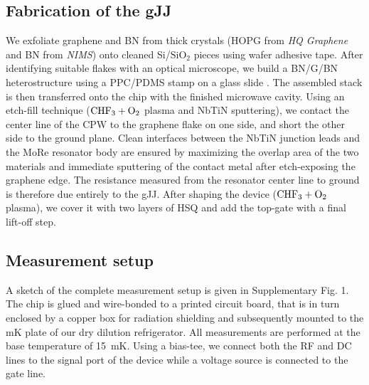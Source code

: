 \subsection*{Fabrication of the gJJ}
We exfoliate graphene and BN from thick crystals (HOPG from \textit{HQ Graphene} and BN from \textit{NIMS}\cite{taniguchi_synthesis_2007}) onto cleaned Si/$\mathrm{SiO_2}$ pieces using wafer adhesive tape.
After identifying suitable flakes with an optical microscope, we build a BN/G/BN heterostructure using a PPC/PDMS stamp on a glass slide \cite{pizzocchero_hot_2016,wang_onedimensional_2013}.
The assembled stack is then transferred onto the chip with the finished microwave cavity.
Using an etch-fill technique ($\ce{CHF3} + \ce{O2}$ plasma and NbTiN sputtering), we contact the center line of the CPW to the graphene flake on one side, and short the other side to the ground plane.
Clean interfaces between the NbTiN junction leads and the MoRe resonator body are ensured by maximizing the overlap area of the two materials and immediate sputtering of the contact metal after etch-exposing the graphene edge.
The resistance measured from the resonator center line to ground is therefore due entirely to the gJJ.
After shaping the device ($\ce{CHF3} + \ce{O2}$ plasma), we cover it with two layers of HSQ \cite{nanda_currentphase_2017} and add the top-gate with a final lift-off step.

\subsection*{Measurement setup}\label{sec:setup}
\noindent A sketch of the complete measurement setup is given in Supplementary Fig. 1.
The chip is glued and wire-bonded to a printed circuit board, that is in turn enclosed by a copper box for radiation shielding and subsequently mounted to the mK plate of our dry dilution refrigerator.
All measurements are performed at the base temperature of \SI{15}{mK}.
Using a bias-tee, we connect both the RF and DC lines to the signal port of the device while a voltage source is connected to the gate line.

